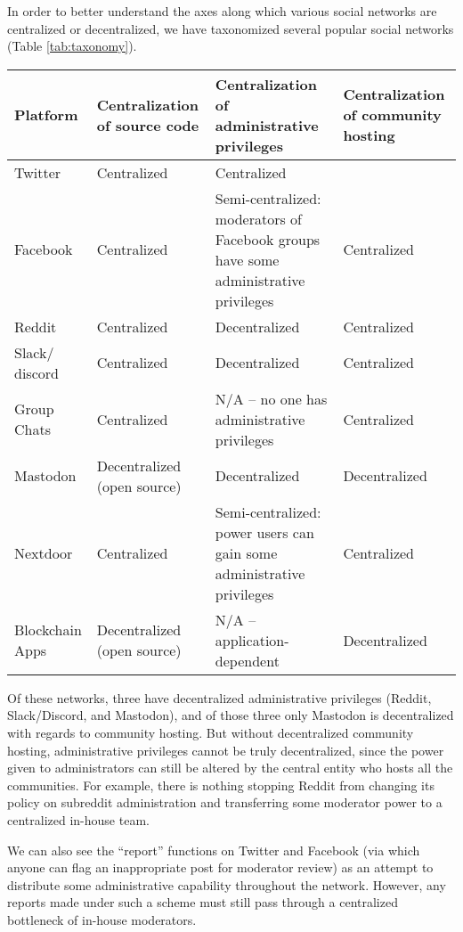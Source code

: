 \documentclass[sigconf,authordraft]{acmart}
\begin{document}
In order to better understand the axes along which various social networks are centralized or decentralized, we have taxonomized several popular social networks  (Table \ref{tab:taxonomy}).


\begin{table*}
  \caption{A taxonomy of online networks}
  \label{tab:taxonomy}
  \begin{tabularx}{\textwidth}{llXX}
    \toprule
    Platform & Centralization of source code & Centralization of administrative privileges & Centralization of community hosting \\
    \midrule
    Twitter  & Centralized & Centralized\\
    Facebook & Centralized & Semi-centralized: moderators of Facebook groups have some administrative privileges & Centralized\\
    Reddit   & Centralized & Decentralized & Centralized  \\
    Slack/ discord & Centralized & Decentralized & Centralized \\
    Group Chats & Centralized & N/A -- no one has administrative privileges & Centralized \\
    Mastodon & Decentralized (open source) & Decentralized & Decentralized\\
    Nextdoor & Centralized & Semi-centralized: power users can gain some administrative privileges & Centralized \\
    Blockchain Apps & Decentralized (open source) & N/A -- application-dependent & Decentralized\\
    \bottomrule
  \end{tabularx}
\end{table*}

Of these networks, three have decentralized administrative privileges (Reddit, Slack/Discord, and Mastodon), and of those three only Mastodon is decentralized with regards to community hosting. But without decentralized community hosting, administrative privileges cannot be truly decentralized, since the power given to administrators can still be altered by the central entity who hosts all the communities. For example, there is nothing stopping Reddit from changing its policy on subreddit administration and transferring some moderator power to a centralized in-house team.

We can also see the ``report'' functions on Twitter and Facebook (via which anyone can flag an inappropriate post for moderator review) as an attempt to distribute some administrative capability throughout the network. However, any reports made under such a scheme must still pass through a centralized bottleneck of in-house moderators. 
\end{document}
